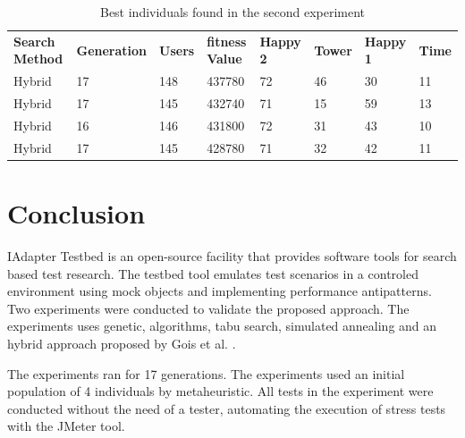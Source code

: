 \documentclass[times]{stvrauth}
\begin{document}
\begin{table}[h]
\centering
\caption{Best individuals found in the second experiment}
\label{tab:bestindividuals2}
\begin{tabular}{llllllll}
\rowcolor[HTML]{FFCCC9} 
\textbf{Search Method} & \textbf{Generation} & \textbf{Users} & \textbf{fitness Value} & \textbf{Happy 2} & \textbf{Tower} & \textbf{Happy 1} & \textbf{Time} \\ 
\multicolumn{1}{l}{Hybrid} & \multicolumn{1}{l}{17} & \multicolumn{1}{l}{148} & \multicolumn{1}{l}{437780} & \multicolumn{1}{l}{72} & \multicolumn{1}{l}{46} & \multicolumn{1}{l}{30} & \multicolumn{1}{l}{11} \\ 
\multicolumn{1}{l}{Hybrid} & \multicolumn{1}{l}{17} & \multicolumn{1}{l}{145} & \multicolumn{1}{l}{432740} & \multicolumn{1}{l}{71} & \multicolumn{1}{l}{15} & \multicolumn{1}{l}{59} & \multicolumn{1}{l}{13} \\ 
\multicolumn{1}{l}{Hybrid} & \multicolumn{1}{l}{16} & \multicolumn{1}{l}{146} & \multicolumn{1}{l}{431800} & \multicolumn{1}{l}{72} & \multicolumn{1}{l}{31} & \multicolumn{1}{l}{43} & \multicolumn{1}{l}{10} \\ 
\multicolumn{1}{l}{Hybrid} & \multicolumn{1}{l}{17} & \multicolumn{1}{l}{145} & \multicolumn{1}{l}{428780} & \multicolumn{1}{l}{71} & \multicolumn{1}{l}{32} & \multicolumn{1}{l}{42} & \multicolumn{1}{l}{11} \\ 
\end{tabular}
\end{table}

\section{Conclusion}

IAdapter Testbed is an open-source facility that provides software tools for search based test research. The testbed tool emulates test scenarios in a controled environment using mock objects and implementing performance antipatterns.  Two experiments were conducted to validate the proposed approach. The experiments uses genetic, algorithms, tabu search, simulated annealing and an hybrid approach proposed by Gois et al. \cite{Gois2016}.

The experiments ran for 17 generations. The experiments used an initial population of 4 individuals by metaheuristic. All tests in the experiment were conducted without the need of a tester, automating the execution of stress tests with the JMeter tool.
\end{document}
